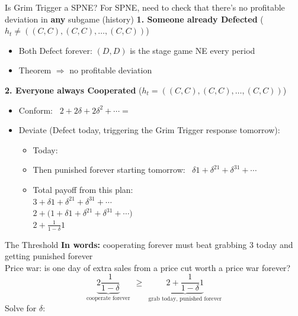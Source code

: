 \begin{frame}{Is Grim Trigger a SPNE?}
For SPNE, need to check that there's no profitable deviation in \textbf{any} subgame (history)
\bsk
\textbf{1. Someone already Defected} ($h_t\neq ((C,C),(C,C),\ldots,(C,C))$)
\begin{itemize}
    \item Both Defect forever: $(D,D)$ is the stage game NE every period
    \item Theorem $\Rightarrow$ no profitable deviation \checkmark
\end{itemize}
\bsk
\textbf{2. Everyone always Cooperated} ($h_t= ((C,C),(C,C),\ldots,(C,C))$)
\begin{itemize}
    \item Conform: \ $2+2\delta+2\delta^2+\cdots=$ \underline{\hspace{0.8in}}
    \item Deviate (Defect today, triggering the Grim Trigger response tomorrow):
    \begin{itemize}
        \item Today: \underline{\hspace{0.3in}}
        \item Then punished forever starting tomorrow: \ $\delta1+\delta^21+\delta^31+\cdots$
        \item Total payoff from this plan:\\
        $3+\delta1+\delta^21+\delta^31+\cdots$\\
        $2+\big(1+\delta1+\delta^21+\delta^31+\cdots\big)$\\
        $2+\frac{1}{1-\delta}1$
    \end{itemize}
\end{itemize}
\vspace{-0.2in}
\end{frame}

\begin{frame}{The Threshold}
\textbf{In words:} cooperating forever must beat grabbing 3 today and getting punished forever\\
{\footnotesize Price war: is one day of extra sales from a price cut worth a price war forever?}
\bsk
$$\underbrace{2\frac{1}{1-\delta}}_{\text{cooperate forever}}\ \ \ge\ \ \underbrace{2+\frac{1}{1-\delta}1}_{\text{grab today, punished forever}}$$
\bsk
Solve for $\delta$:
\end{frame}

